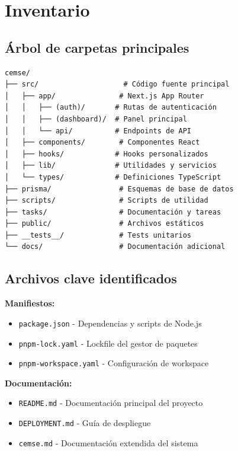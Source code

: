 \documentclass[12pt,a4paper]{article}
\begin{document}
\section{Inventario}

\subsection{Árbol de carpetas principales}

\begin{verbatim}
cemse/
├── src/                    # Código fuente principal
│   ├── app/               # Next.js App Router
│   │   ├── (auth)/       # Rutas de autenticación
│   │   ├── (dashboard)/  # Panel principal
│   │   └── api/          # Endpoints de API
│   ├── components/        # Componentes React
│   ├── hooks/            # Hooks personalizados
│   ├── lib/              # Utilidades y servicios
│   └── types/            # Definiciones TypeScript
├── prisma/                # Esquemas de base de datos
├── scripts/               # Scripts de utilidad
├── tasks/                 # Documentación y tareas
├── public/                # Archivos estáticos
├── __tests__/             # Tests unitarios
└── docs/                  # Documentación adicional
\end{verbatim}

\subsection{Archivos clave identificados}

\textbf{Manifiestos:}
\begin{itemize}
    \item \texttt{package.json} - Dependencias y scripts de Node.js
    \item \texttt{pnpm-lock.yaml} - Lockfile del gestor de paquetes
    \item \texttt{pnpm-workspace.yaml} - Configuración de workspace
\end{itemize}

\textbf{Documentación:}
\begin{itemize}
    \item \texttt{README.md} - Documentación principal del proyecto
    \item \texttt{DEPLOYMENT.md} - Guía de despliegue
    \item \texttt{cemse.md} - Documentación extendida del sistema
\end{itemize}
\end{document}
